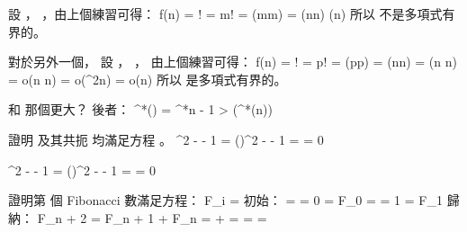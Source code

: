 設 ， ，由上個練習可得：
\startformula\startalign
 \NC \lg f(n) \NC = \lg \lceil{}\rceil ! \NR
 \NC          \NC = \lg m! \NR
 \NC          \NC = \Theta(m\lg m) \NR
 \NC          \NC = \Theta(\lceil\lg n\rceil \lg \lceil \lg n\rceil) \NR
 \NC          \NC \neq \Theta(\lg n) \NR
\stopalign\stopformula
所以  {\EMP 不是}多項式有界的。

對於另外一個，
設 ， ，
由上個練習可得：
\startformula\startalign
 \NC \lg f(n) \NC = \lg \lceil{}\rceil ! \NR
 \NC          \NC = \lg p! \NR
 \NC          \NC = \Theta(p\lg p) \NR
 \NC          \NC = \Theta(\lceil\lg\lg n\rceil \lg \lceil \lg\lg n\rceil) \NR
 \NC          \NC = \Theta(\lg\lg n \lg\lg\lg n) \NR
 \NC          \NC = o(\lg\lg n \lg\lg n) \NR
 \NC          \NC = o(\lg^2\lg n) \NR
 \NC          \NC = o(\lg n) \NR
\stopalign\stopformula
所以  {\EMP 是}多項式有界的。
\stopANSWER

\startEXERCISE
{} 和  那個更大？
\stopEXERCISE
\startANSWER
後者：
\startformula
\lg^*() = \lg^*n - 1 > \lg(\lg^*(n))
\stopformula
\stopANSWER

\startEXERCISE
證明 \m{\phi} 及其共扼 \m{\hat \phi} 均滿足方程 。
\stopEXERCISE
\startANSWER
\startformula\startalign
 \NC \phi^2 - \phi - 1 \NC = ()^2 -  - 1 \NR
 \NC                   \NC =  \NR
 \NC                   \NC = 0 \NR
\stopalign\stopformula

\startformula\startalign
 \NC \hat\phi^2 - \hat\phi - 1 \NC = ()^2 -  - 1 \NR
 \NC                           \NC =  \NR
 \NC                           \NC = 0 \NR
\stopalign\stopformula
\stopANSWER

\startEXERCISE
證明第  個 Fibonacci 數滿足方程：
\startformula
F_i = 
\stopformula
\stopEXERCISE
\startANSWER
初始：
\startformula\startalign
{} =  = 0 = F_0 \NR
{} =  = 1 = F_1 \NR
\stopalign\stopformula
歸納：
\startformula\startalign
 \NC F_{n + 2} \NC = F_{n + 1} + F_n \NR
 \NC           \NC =  +  \NR
 \NC           \NC =  \NR
 \NC           \NC =  \NR
 \NC           \NC =  \NR
\stopalign\stopformula
\stopANSWER

